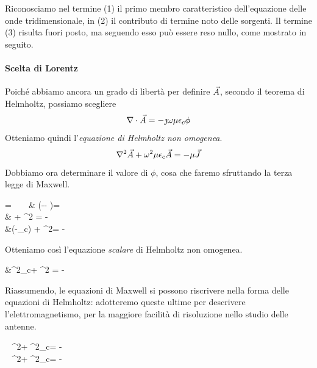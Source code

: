 Riconosciamo nel termine (1) il primo membro caratteristico dell'equazione delle onde tridimensionale, in (2) il contributo di termine noto delle sorgenti.
Il termine (3) risulta fuori posto, ma seguendo esso può essere reso nullo, come mostrato in seguito.

\paragraph{Scelta di Lorentz}
Poiché abbiamo ancora un grado di libertà per definire $\vec{A}$, secondo il teorema di Helmholtz, possiamo scegliere
\begin{equation}
	\nabla\cdot \vec{A} = -\jmath \omega \mu \epsilon_c \phi
\end{equation}
Otteniamo quindi l'\emph{equazione di Helmholtz non omogenea}.
\begin{equation}
	\nabla^2\vec{A} + \omega^2 \mu\epsilon_c\vec{A} =-\mu \vec{J}
\end{equation}
Dobbiamo ora determinare il valore di $\phi$, cosa che faremo sfruttando la terza legge di Maxwell.
\begin{esp*}
	\diverg\E
	= \frac{\rho}{\epsilon} ~ \implies ~
	& \diverg\left(-\jmath \omega \A - \nabla \phi	 \right)= \frac{\rho}{\epsilon} \\
	& \jmath \omega \diverg \A + \nabla^2 \phi= -\frac{\rho}{\epsilon} \\
	&\jmath\omega\left(-\jmath \omega\mu\epsilon_c\phi\right) + \nabla^2\phi = - \frac{\rho}{\epsilon}\\
\end{esp*}

Otteniamo così l'equazione \emph{scalare} di Helmholtz non omogenea.
\begin{esp*}
	&\omega^2\mu\epsilon_c\phi + \nabla^2 \phi = -\frac{\rho}{\epsilon}
\end{esp*}

Riassumendo, le equazioni di Maxwell si possono riscrivere nella forma delle equazioni di Helmholtz: adotteremo queste ultime per descrivere l'elettromagnetismo, per la maggiore facilità di risoluzione nello studio delle antenne.

\begin{esp}\label{eq:helmolts-lorentz}
	\begin{dcases}
		~ \nabla^2\A + \omega^2\mu\epsilon_c\A = -\mu\J \\
		~ \nabla^2\phi + \omega^2\mu\epsilon_c\phi = -\frac{\rho}{\epsilon}
	\end{dcases}
\end{esp}


